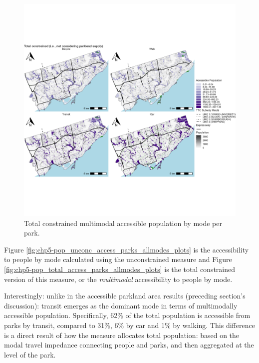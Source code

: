 \documentclass[
11pt, %
oneside, %
english, %
singlespacing, %
]{macthesis} %
\begin{document}
\begin{figure}

{\centering \includegraphics[width=6in]{./data/figures/chp5-pop_total_access_parks_allmodes_plots} 

}

\caption{\label{fig:chp5-pop_total_access_parks_allmodes_plots} Total constrained multimodal accessible population by mode per park.}\label{fig:unnamed-chunk-87}
\end{figure}

Figure \ref{fig:chp5-pop_unconc_access_parks_allmodes_plots} is the accessibility to people by mode calculated using the unconstrained measure and Figure \ref{fig:chp5-pop_total_access_parks_allmodes_plots} is the total constrained version of this measure, or the \emph{multimodal} accessibility to people by mode.

Interestingly: unlike in the accessible parkland area results (preceding section's discussion): transit emerges as the dominant mode in terms of multimodally accessible population. Specifically, 62\% of the total population is accessible from parks by transit, compared to 31\%, 6\% by car and 1\% by walking. This difference is a direct result of how the measure allocates total population: based on the modal travel impedance connecting people and parks, and then aggregated at the level of the park.
\end{document}
